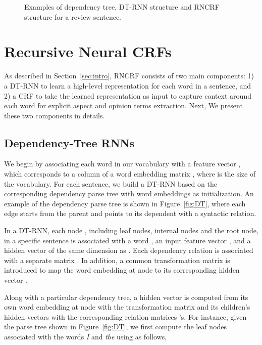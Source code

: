 \documentclass[11pt,letterpaper]{article}
\begin{document}
\begin{figure*}[t!]
	\centering
	\hspace{3mm}
	\hspace{3mm}
	\caption{Examples of dependency tree, DT-RNN structure and RNCRF structure for a review sentence.}\label{fig:model:overview}
\end{figure*}


\section{Recursive Neural CRFs}

As described in Section~\ref{sec:intro}, RNCRF consists of two main components: 1) a DT-RNN to learn a high-level representation for each word in a sentence, and 2) a CRF to take the learned representation as input to capture context around each word for explicit aspect and opinion terms extraction. Next, We present these two components in details.

\subsection{Dependency-Tree RNNs}
We begin by associating each word  in our vocabulary with a feature vector , which corresponds to a column of a word embedding matrix , where  is the size of the vocabulary. For each sentence, we build a DT-RNN based on the corresponding dependency parse tree with word embeddings as initialization. An example of the dependency parse tree is shown in Figure~\ref{fig:DT}, where each edge starts from the parent and points to its dependent with a syntactic relation. 

In a DT-RNN, each node , including leaf nodes, internal nodes and the root node, in a specific sentence is associated with a word , an input feature vector , and a hidden vector  of the same dimension as . Each dependency relation  is associated with a separate matrix . In addition, a common transformation matrix  is introduced to map the word embedding  at node  to its corresponding hidden vector .

Along with a particular dependency tree, a hidden vector  is computed from its own word embedding  at node  with the transformation matrix  and its children's hidden vectors  with the corresponding relation matrices 's. For instance, given the parse tree shown in Figure~\ref{fig:DT}, we first compute the leaf nodes associated with the words \textit{I} and \textit{the} using  as follows,
\end{document}
